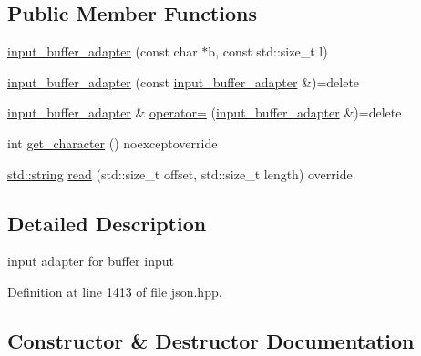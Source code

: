 \subsection*{Public Member Functions}
\begin{DoxyCompactItemize}
\item 
\hyperlink{classnlohmann_1_1detail_1_1input__buffer__adapter_aee9d094d369bcd8f110eae4a175a8fa9}{input\+\_\+buffer\+\_\+adapter} (const char $\ast$b, const std\+::size\+\_\+t l)
\item 
\hyperlink{classnlohmann_1_1detail_1_1input__buffer__adapter_ada76d7b75c5d6b989af0e18687ef07b6}{input\+\_\+buffer\+\_\+adapter} (const \hyperlink{classnlohmann_1_1detail_1_1input__buffer__adapter}{input\+\_\+buffer\+\_\+adapter} \&)=delete
\item 
\hyperlink{classnlohmann_1_1detail_1_1input__buffer__adapter}{input\+\_\+buffer\+\_\+adapter} \& \hyperlink{classnlohmann_1_1detail_1_1input__buffer__adapter_a0871125057d993684ba8e45fb2b8a76b}{operator=} (\hyperlink{classnlohmann_1_1detail_1_1input__buffer__adapter}{input\+\_\+buffer\+\_\+adapter} \&)=delete
\item 
int \hyperlink{classnlohmann_1_1detail_1_1input__buffer__adapter_a3f03f910db299a9066923ddcccdb8a3c}{get\+\_\+character} () noexceptoverride
\item 
\hyperlink{namespacenlohmann_1_1detail_a90aa5ef615aa8305e9ea20d8a947980fab45cffe084dd3d20d928bee85e7b0f21}{std\+::string} \hyperlink{classnlohmann_1_1detail_1_1input__buffer__adapter_af124e55c96814ae3a272dd5f0cb5351b}{read} (std\+::size\+\_\+t offset, std\+::size\+\_\+t length) override
\end{DoxyCompactItemize}


\subsection{Detailed Description}
input adapter for buffer input 

Definition at line 1413 of file json.\+hpp.



\subsection{Constructor \& Destructor Documentation}
